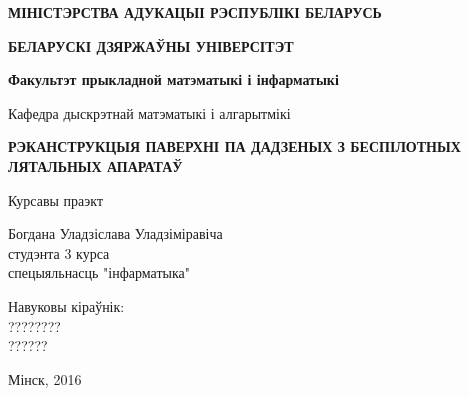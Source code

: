 \begin{titlepage}
    \begin{center}
        {\bf МІНІСТЭРСТВА АДУКАЦЫІ РЭСПУБЛІКІ БЕЛАРУСЬ}
    \end{center}
    \begin{center}
        {\bf БЕЛАРУСКІ ДЗЯРЖАЎНЫ УНІВЕРСІТЭТ}
    \end{center}
    \begin{center}
        {\bf Факультэт прыкладной матэматыкі і інфарматыкі}
    \end{center}
    \begin{center}
        Кафедра дыскрэтнай матэматыкі і алгарытмікі
    \end{center}
    
    \vspace{9em}
    
    \begin{center}
        {\bf РЭКАНСТРУКЦЫЯ ПАВЕРХНІ ПА ДАДЗЕНЫХ З БЕСПІЛОТНЫХ ЛЯТАЛЬНЫХ АПАРАТАЎ}
    \end{center}
    
    \vspace{2em}
    
    \begin{center}
        Курсавы праэкт
    \end{center}
    
    \vspace{4em}
    
    \begin{flushright}
        Богдана Уладзіслава Уладзіміравіча\\
        студэнта 3 курса\\
        спецыяльнасць "інфарматыка"\\
    \end{flushright}
    
    \vspace{1em}
    
    \begin{flushright}
        Навуковы кіраўнік:\\
        ????????\\
        ??????\\
    \end{flushright}
    
    \vfill
    
    \begin{center}
        Мінск, 2016
    \end{center}
\end{titlepage}
\newpage
